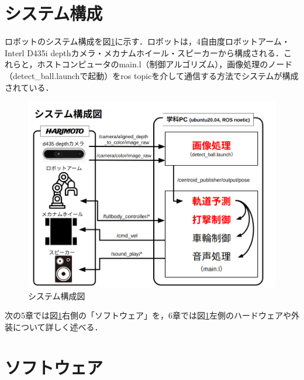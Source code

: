 \documentclass[10pt, oneside, titlepage]{ltjarticle}  %
\begin{document}
\section{システム構成}
ロボットのシステム構成を図\ref{system}に示す．ロボットは，4自由度ロボットアーム・Interl D435i depthカメラ・メカナムホイール・スピーカーから構成される．これらと，ホストコンピュータのmain.l（制御アルゴリズム），画像処理のノード（detect\_ball.launchで起動）をros topicを介して通信する方法でシステムが構成されている．
\begin{figure}[H]
\centering
\includegraphics[width=12cm]{figures/system.png}
\caption{システム構成図}
\label{system}
\end{figure}
次の5章では図\ref{system}右側の「ソフトウェア」を，6章では図\ref{system}左側のハードウェアや外装について詳しく述べる．

\section{ソフトウェア}
\end{document}
